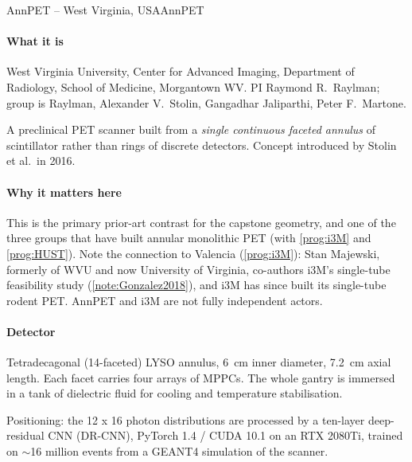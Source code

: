  
 
\begin{programnote}{AnnPET -- West Virginia, USA}{AnnPET}
 
\paragraph{What it is}
West Virginia University, Center for Advanced Imaging, Department of Radiology,
School of Medicine, Morgantown WV. PI Raymond R.\ Raylman; group is Raylman,
Alexander V.\ Stolin, Gangadhar Jaliparthi, Peter F.\ Martone.
 
A preclinical PET scanner built from a \emph{single continuous faceted annulus}
of scintillator rather than rings of discrete detectors. Concept introduced by
Stolin et al.\ in 2016.
 
\paragraph{Why it matters here}
This is the primary prior-art contrast for the capstone geometry, and one of
the three groups that have built annular monolithic PET (with \ref{prog:i3M} and
\ref{prog:HUST}). Note the connection to Valencia
(\ref{prog:i3M}): Stan Majewski, formerly of WVU and now University of
Virginia, co-authors i3M's single-tube feasibility study
(\ref{note:Gonzalez2018}), and i3M has since built its single-tube rodent PET.
AnnPET and i3M are not fully independent actors.
 
\paragraph{Detector}
Tetradecagonal (14-faceted) LYSO annulus, \qty{6}{\centi\metre} inner diameter,
\qty{7.2}{\centi\metre} axial length. Each facet carries four
 arrays of  MPPCs. The whole
gantry is immersed in a tank of dielectric fluid for cooling and temperature
stabilisation.
 
Positioning: the 12 x 16 photon distributions are processed by a ten-layer
deep-residual CNN (DR-CNN), PyTorch 1.4 / CUDA 10.1 on an RTX 2080Ti, trained on
$\sim$16 million events from a GEANT4 simulation of the scanner.
 

\end{programnote}
